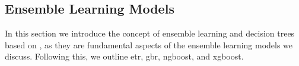 \subsection{Ensemble Learning Models}
In this section we introduce the concept of ensemble learning and decision trees based on \citet{James2023AnIS}, as they are fundamental aspects of the ensemble learning models we discuss.
Following this, we outline \gls{etr}, \gls{gbr}, \gls{ngboost}, and \gls{xgboost}.







